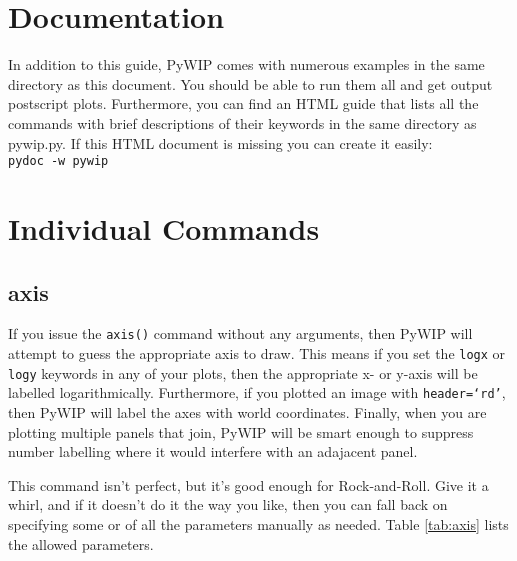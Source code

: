 \documentclass[12pt]{article}
\newcommand{\pywip}{PyWIP}
\begin{document}
\section{Documentation}

In addition to this guide, \pywip{} comes with numerous examples in the same
directory as this document. You should be able to run them all and get output
postscript plots.  Furthermore, you can find an HTML guide that lists all the
commands with brief descriptions of their keywords in the same directory as
pywip.py.  If this HTML document is missing you can create it easily:\\
\texttt{pydoc -w pywip}

\section{Individual Commands}

\subsection{axis}

If you issue the \texttt{axis()} command without any arguments, then \pywip{}
will attempt to guess the appropriate axis to draw.  This means if you set
the \texttt{logx} or \texttt{logy} keywords in any of your plots, then the
appropriate x- or y-axis will be labelled logarithmically.  Furthermore,
if you plotted an image with \texttt{header=`rd'}, then \pywip{} will label
the axes with world coordinates.  Finally, when you are plotting multiple
panels that join, \pywip{} will be smart enough to suppress number labelling
where it would interfere with an adajacent panel.

This command isn't perfect, but it's good enough for Rock-and-Roll.  Give it a
whirl, and if it doesn't do it the way you like, then you can fall back on
specifying some or of all the parameters manually as needed.  Table
\ref{tab:axis} lists the allowed parameters.
\end{document}
